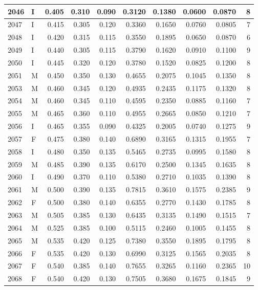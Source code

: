 \documentclass[9pt,twocolumn,twoside,]{pnas-new}
\begin{document}
\begin{tabular}{l|l|r|r|r|r|r|r|r|r}
\hline
2046 & I & 0.405 & 0.310 & 0.090 & 0.3120 & 0.1380 & 0.0600 & 0.0870 & 8\\
\hline
2047 & I & 0.415 & 0.305 & 0.120 & 0.3360 & 0.1650 & 0.0760 & 0.0805 & 7\\
\hline
2048 & I & 0.420 & 0.315 & 0.115 & 0.3550 & 0.1895 & 0.0650 & 0.0870 & 6\\
\hline
2049 & I & 0.440 & 0.305 & 0.115 & 0.3790 & 0.1620 & 0.0910 & 0.1100 & 9\\
\hline
2050 & I & 0.445 & 0.320 & 0.120 & 0.3780 & 0.1520 & 0.0825 & 0.1200 & 8\\
\hline
2051 & M & 0.450 & 0.350 & 0.130 & 0.4655 & 0.2075 & 0.1045 & 0.1350 & 8\\
\hline
2053 & M & 0.460 & 0.345 & 0.120 & 0.4935 & 0.2435 & 0.1175 & 0.1320 & 8\\
\hline
2054 & M & 0.460 & 0.345 & 0.110 & 0.4595 & 0.2350 & 0.0885 & 0.1160 & 7\\
\hline
2055 & M & 0.465 & 0.360 & 0.110 & 0.4955 & 0.2665 & 0.0850 & 0.1210 & 7\\
\hline
2056 & I & 0.465 & 0.355 & 0.090 & 0.4325 & 0.2005 & 0.0740 & 0.1275 & 9\\
\hline
2057 & F & 0.475 & 0.380 & 0.140 & 0.6890 & 0.3165 & 0.1315 & 0.1955 & 7\\
\hline
2058 & I & 0.480 & 0.350 & 0.135 & 0.5465 & 0.2735 & 0.0995 & 0.1580 & 8\\
\hline
2059 & M & 0.485 & 0.390 & 0.135 & 0.6170 & 0.2500 & 0.1345 & 0.1635 & 8\\
\hline
2060 & I & 0.490 & 0.370 & 0.110 & 0.5380 & 0.2710 & 0.1035 & 0.1390 & 8\\
\hline
2061 & M & 0.500 & 0.390 & 0.135 & 0.7815 & 0.3610 & 0.1575 & 0.2385 & 9\\
\hline
2062 & F & 0.500 & 0.380 & 0.140 & 0.6355 & 0.2770 & 0.1430 & 0.1785 & 8\\
\hline
2063 & M & 0.505 & 0.385 & 0.130 & 0.6435 & 0.3135 & 0.1490 & 0.1515 & 7\\
\hline
2064 & M & 0.525 & 0.385 & 0.100 & 0.5115 & 0.2460 & 0.1005 & 0.1455 & 8\\
\hline
2065 & M & 0.535 & 0.420 & 0.125 & 0.7380 & 0.3550 & 0.1895 & 0.1795 & 8\\
\hline
2066 & F & 0.535 & 0.420 & 0.130 & 0.6990 & 0.3125 & 0.1565 & 0.2035 & 8\\
\hline
2067 & F & 0.540 & 0.385 & 0.140 & 0.7655 & 0.3265 & 0.1160 & 0.2365 & 10\\
\hline
2068 & F & 0.540 & 0.420 & 0.130 & 0.7505 & 0.3680 & 0.1675 & 0.1845 & 9\\

\end{tabular}
\end{document}
